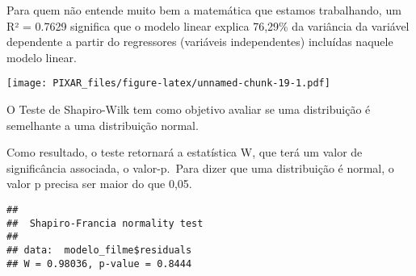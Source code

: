 \documentclass[
]{article}
\begin{document}
Para quem não entende muito bem a matemática que estamos trabalhando, um
R² = 0.7629 significa que o modelo linear explica 76,29\% da variância
da variável dependente a partir do regressores (variáveis independentes)
incluídas naquele modelo linear.

\texttt{[image: PIXAR\_files/figure-latex/unnamed-chunk-19-1.pdf]}

O Teste de Shapiro-Wilk tem como objetivo avaliar se uma distribuição é
semelhante a uma distribuição normal.

Como resultado, o teste retornará a estatística W, que terá um valor de
significância associada, o valor-p.~Para dizer que uma distribuição é
normal, o valor p precisa ser maior do que 0,05.

\begin{verbatim}
## 
##  Shapiro-Francia normality test
## 
## data:  modelo_filme$residuals
## W = 0.98036, p-value = 0.8444
\end{verbatim}
\end{document}
